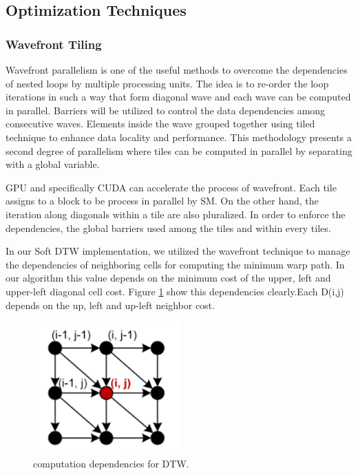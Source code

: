 \documentclass[12pt, letterpaper]{article}
\begin{document}
\subsection{Optimization Techniques}

\subsubsection{Wavefront Tiling}
Wavefront parallelism is one of the useful methods to overcome the dependencies of nested loops
by multiple processing units. The idea is to re-order the loop iterations in such a way that
form diagonal wave and each wave can be computed in parallel. Barriers will be utilized to control
the data dependencies among consecutive waves. Elements inside the wave grouped together using tiled
technique to enhance data locality and performance. This methodology presents a second degree of parallelism
where tiles can be computed in parallel by separating with a global variable.

GPU and specifically CUDA can accelerate the process of wavefront. Each tile assigns
to a block to be process in parallel by SM. On the other hand, the iteration along diagonals within a tile are also
pluralized. In order to enforce the dependencies, the global barriers used among the tiles and within every tiles.\cite{belviranli_peerwave_2015}

In our Soft DTW implementation, we utilized the wavefront technique to manage the dependencies of neighboring cells for 
computing the minimum warp path. In our algorithm this value depends on the minimum cost of the upper, 
left and upper-left diagonal cell cost. Figure \ref{DTW_dependency} show this dependencies clearly.Each D(i,j) depends on the up, left and up-left neighbor cost. 

\begin{figure}[htbp]
\includegraphics[height=2in]{img/tiling_dependencies.png}
\centering
\caption{computation dependencies for DTW.}
\label{DTW_dependency}
\end{figure}
\end{document}
